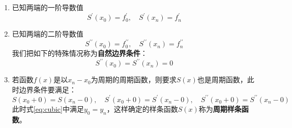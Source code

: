 \begin{enumerate}
	\item 已知两端的一阶导数值
		\begin{equation}
			S^{\prime}(x_0) = f^\prime_0, \quad S^{\prime}(x_n) = f^\prime_n	\label{eq:first_boundary}
		\end{equation} 
	\item 已知两端的二阶导数值
		\begin{equation}
			S^{\prime\prime}(x_0) = f^{\prime\prime}_0, \quad S^{\prime\prime}(x_n) = f^{\prime\prime}_n	\label{eq:second_boundary}
		\end{equation} 
	我们把如下的特殊情况称为\textbf{自然边界条件}：
	\begin{equation}
		S^{\prime\prime}(x_0) = S^{\prime\prime}(x_n) = 0	\label{eq:natural_boundary}
	\end{equation} 
	\item 若函数$f(x)$是以$x_n - x_0$为周期的周期函数，则要求$S(x)$也是周期函数，此时边界条件要满足：
		\begin{equation}
			S(x_0 + 0 ) = S(x_n - 0), \quad S^{\prime}(x_0 + 0 ) = S^{\prime}(x_n - 0), \quad S^{\prime\prime} (x_0 + 0) = S^{\prime\prime}(x_n - 0)	\label{third_boundary}
		\end{equation} 
		此时式\eqref{eq:cubic}中满足$y_0 = y_n$，这样确定的样条函数$S(x)$称为\textbf{周期样条函数}。
\end{enumerate}
